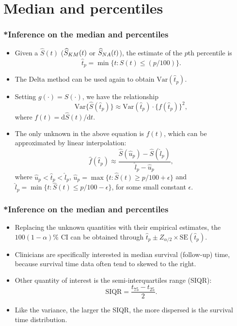 \documentclass[10pt]{beamer}\usepackage[]{graphicx}\usepackage[]{color}
\newcommand{\dif}{\mathrm{d}}
\newcommand{\tp}{\hat t_p}
\newcommand{\Var}{\mathrm{Var}}
\newcommand{\SE}{\mathrm{SE}}
\newcommand{\Ss}{\widehat{S}}
\newcommand{\Skm}{\widehat{S}_{\scriptsize{KM}}}
\newcommand{\Sna}{\widehat{S}_{\scriptsize{NA}}}
\begin{document}
\section{Median and percentiles}
\begin{frame}
  \frametitle{*Inference on the median and percentiles}
  \begin{itemize}
  \item Given a $\Ss(t)$ ($\Skm(t)$ or $\Sna(t)$), the estimate of the $p$th percentile is 
    $$ \tp = \min\{t: \hat{S}(t) \le (p / 100)\}.$$
  \item The Delta method can be used again to obtain $\Var(\tp)$.
  \item Setting $g(\cdot) = S(\cdot)$, we have the relationship
    \begin{equation*}
    \Var\{\Ss(\tp)\} \approx \Var(\tp) \cdot \{f(\tp)\}^2,
    \label{eq:mp}
    \end{equation*}
    where $f(t) = \dif \Ss(t) / \dif t$.
  \item The only unknown in the above equation is $f(t)$, 
    which can be approximated by linear interpolation:
    $$\hat f(\tp) \approx\frac{\Ss(\hat u_p) - \Ss(\hat l_p)}{\hat l_p - \hat u_p}, $$
    where $\hat u_p < \tp < \hat l_p$, $\hat u_p = \max\{t:\Ss(t) \ge p / 100 + \epsilon\}$ and 
    $\hat l_p = \min\{t:\Ss(t) \le p / 100 - \epsilon\}$, for some small constant $\epsilon$.
  \end{itemize}
\end{frame}

\begin{frame}[fragile]
  \frametitle{*Inference on the median and percentiles}
  \begin{itemize}
  \item Replacing the unknown quantities with their empirical estimates, 
    the $100(1-\alpha)$\% CI can be obtained through
    $\tp \pm Z_{\alpha/2}\times\SE(\tp)$.
  \item Clinicians are specifically interested in median survival (follow-up) time, 
    because survival time data often tend to skewed to the right.
  \item Other quantity of interest is the semi-interquartiles range (SIQR):
    $$\mbox{SIQR} = \frac{t_{75} - t_{25}}{2}.$$
  \item Like the variance, the larger the SIQR, the more dispersed is the survival time distribution.
  \end{itemize}
\end{frame}
\end{document}
